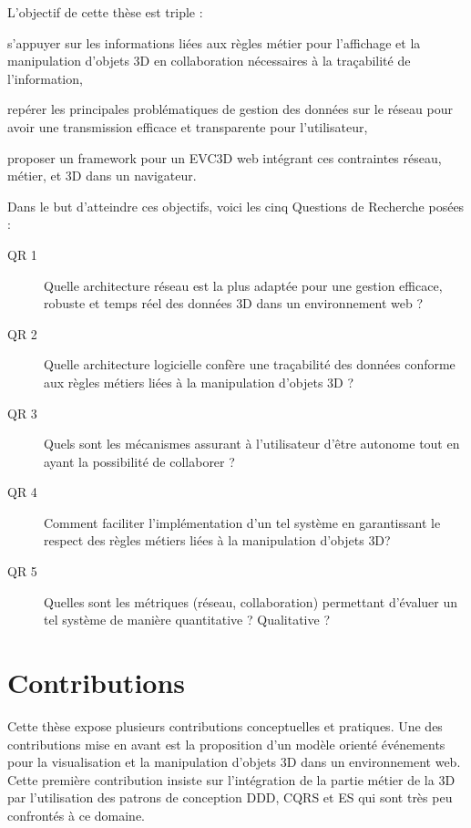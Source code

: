L'objectif de cette thèse est triple : 
\begin{enumerate*}[label=(\roman*)]
	\item s'appuyer sur les informations liées aux règles métier pour l'affichage et la 
	manipulation d'objets \gls{3D} en collaboration nécessaires à la traçabilité de 
	l'information,
	\item repérer les principales problématiques de gestion des données sur le 
	réseau pour avoir une transmission efficace et transparente pour l'utilisateur,
	\item proposer un \gls{framework} pour un \gls{EVC3D} web intégrant ces 
	contraintes réseau, métier, et \gls{3D} dans un navigateur.
\end{enumerate*}
Dans le but d'atteindre ces objectifs, voici les cinq Questions de Recherche 
posées :
\begin{description}
	\item[QR 1] Quelle architecture réseau est la plus adaptée pour une gestion 
	efficace, robuste et temps réel des données \gls{3D} dans un environnement 
	web ?
	
	\item[QR 2] Quelle architecture logicielle confère une traçabilité des données 
	conforme aux règles métiers liées à la manipulation d'objets \gls{3D} ? 
	
	\item[QR 3] Quels sont les mécanismes assurant à l'utilisateur d'être 
	autonome tout en ayant la possibilité de collaborer ?
	
	
	\item[QR 4] Comment faciliter l'implémentation d'un tel système en garantissant 
	le respect des règles métiers liées à la manipulation d'objets \gls{3D}?
	
	\item[QR 5] Quelles sont les métriques (réseau, collaboration) permettant 
	d'évaluer un tel système de manière quantitative ? Qualitative ? %
	
\end{description}

\section{Contributions}
Cette thèse expose plusieurs contributions conceptuelles et pratiques.
Une des contributions mise en avant est la proposition d'un modèle orienté événements pour la visualisation et la manipulation d'objets \gls{3D} dans un environnement web. 
Cette première contribution insiste sur l'intégration de la partie métier de la 
\gls{3D} par l'utilisation des patrons de conception \gls{DDD}, \gls{CQRS} et 
\gls{ES} qui sont très peu confrontés à ce domaine. 

